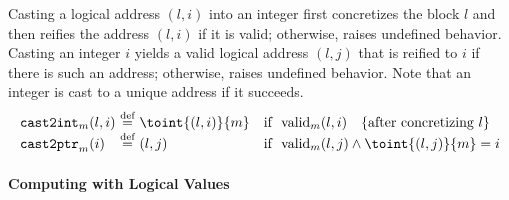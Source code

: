 Casting a logical address $(l,i)$ into an integer first concretizes the
block $l$ and then reifies the address $(l,i)$ if it is valid;
otherwise, raises undefined behavior.  Casting an integer $i$ yields a
valid logical address $(l,j)$ that is reified to $i$ if there is such
an address; otherwise, raises undefined behavior. Note that 
an integer is cast to a unique address if it succeeds.
\[
\begin{array}{@{}l@{~}c@{~}ll@{}}
\code{cast2int}_m(l,i) &\defeq& \toint{(l,i)}{m} &\text{if }~ \text{valid}_m(l,i)
~~~\text{\{after concretizing $l$\}}
\\
\code{cast2ptr}_m(i)   &\defeq& (l,j) & \text{if }~ \text{valid}_m(l,j) \land \toint{(l,j)}{m}=i \\
\end{array}
\]


\paragraph{Computing with Logical Values}



